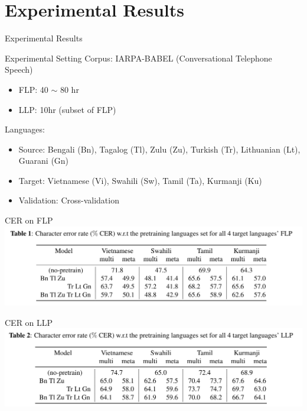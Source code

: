 \documentclass{beamer}
\begin{document}
\section{Experimental Results}
\begin{frame}
	\begin{center}
    \LARGE{Experimental Results}
	\end{center}
\end{frame}

\begin{frame}[t]{Experimental Setting}
  Corpus: IARPA-BABEL (Conversational Telephone Speech)
  \begin{itemize}
    \item FLP: 40 $\sim$ 80 hr
    \item LLP: 10hr (subset of FLP)
  \end{itemize}
  \pause
  Languages:
  \begin{itemize}
    \item Source: Bengali (Bn), Tagalog (Tl), Zulu (Zu), Turkish (Tr), Lithuanian (Lt), Guarani (Gn)
    \item Target: Vietnamese (Vi), Swahili (Sw), Tamil (Ta), Kurmanji (Ku)
    \item Validation: Cross-validation
  \end{itemize}
\end{frame}

\begin{frame}[t]{CER on FLP}
  \center \includegraphics[width=1.0\textwidth]{fig/flp_table.png}
\end{frame}

\begin{frame}[t]{CER on LLP}
  \center \includegraphics[width=1.0\textwidth]{fig/llp_table.png}
\end{frame}
\end{document}
